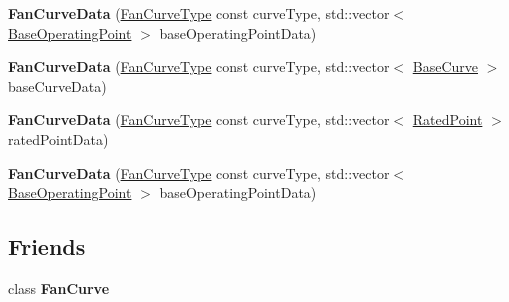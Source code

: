 \begin{DoxyCompactItemize}
\item 
\mbox{\label{class_fan_curve_data_a06a924f8d9b61eabc3fcaf2b32fc9bff}} 
{\bfseries Fan\+Curve\+Data} (\hyperlink{___c_pack___packages_2_darwin_2_s_t_g_z_2amo__tools__suite--_darwin-x86__64_2amo__tools__suite_2include_2fans_2_fan_curve_8h_a5c9bed68c43ea99f4baf31c4a4cdd0fa}{Fan\+Curve\+Type} const curve\+Type, std\+::vector$<$ \hyperlink{struct_fan_curve_data_1_1_base_operating_point}{Base\+Operating\+Point} $>$ base\+Operating\+Point\+Data)
\item 
\mbox{\label{class_fan_curve_data_a2419372103465feb9dca675d5391c489}} 
{\bfseries Fan\+Curve\+Data} (\hyperlink{___c_pack___packages_2_darwin_2_s_t_g_z_2amo__tools__suite--_darwin-x86__64_2amo__tools__suite_2include_2fans_2_fan_curve_8h_a5c9bed68c43ea99f4baf31c4a4cdd0fa}{Fan\+Curve\+Type} const curve\+Type, std\+::vector$<$ \hyperlink{struct_fan_curve_data_1_1_base_curve}{Base\+Curve} $>$ base\+Curve\+Data)
\item 
\mbox{\label{class_fan_curve_data_aab50cc3aa6ac0208d02691af715d72bb}} 
{\bfseries Fan\+Curve\+Data} (\hyperlink{___c_pack___packages_2_darwin_2_s_t_g_z_2amo__tools__suite--_darwin-x86__64_2amo__tools__suite_2include_2fans_2_fan_curve_8h_a5c9bed68c43ea99f4baf31c4a4cdd0fa}{Fan\+Curve\+Type} const curve\+Type, std\+::vector$<$ \hyperlink{struct_fan_curve_data_1_1_rated_point}{Rated\+Point} $>$ rated\+Point\+Data)
\item 
\mbox{\label{class_fan_curve_data_a06a924f8d9b61eabc3fcaf2b32fc9bff}} 
{\bfseries Fan\+Curve\+Data} (\hyperlink{___c_pack___packages_2_darwin_2_s_t_g_z_2amo__tools__suite--_darwin-x86__64_2amo__tools__suite_2include_2fans_2_fan_curve_8h_a5c9bed68c43ea99f4baf31c4a4cdd0fa}{Fan\+Curve\+Type} const curve\+Type, std\+::vector$<$ \hyperlink{struct_fan_curve_data_1_1_base_operating_point}{Base\+Operating\+Point} $>$ base\+Operating\+Point\+Data)
\end{DoxyCompactItemize}
\subsection*{Friends}
\begin{DoxyCompactItemize}
\item 
\mbox{\label{class_fan_curve_data_a602ac04d4d30425e649d81550cbbc48a}} 
class {\bfseries Fan\+Curve}
\end{DoxyCompactItemize}


